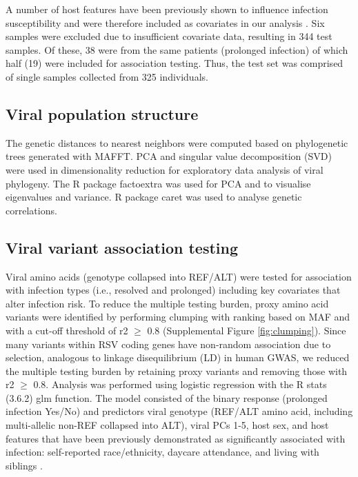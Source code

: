 \documentclass{article} %
\begin{document}
A number of host features have been previously shown to influence infection susceptibility and were therefore included as covariates in our analysis \citep{rosas2022upper}. 
Six samples were excluded due to insufficient covariate data, resulting in 344 test samples. 
Of these, 38 were from the same patients (prolonged infection) of which half (19) were included for association testing. Thus, the test set was comprised of single samples collected from 325 individuals.

\subsection{Viral population structure}
The genetic distances to nearest neighbors were computed based on phylogenetic trees generated with MAFFT. 
PCA and singular value decomposition (SVD) were used in dimensionality reduction for exploratory data analysis of viral phylogeny. 
The R package factoextra was used for PCA and to visualise eigenvalues and variance. R package caret was used to analyse genetic correlations.

\subsection{Viral variant association testing}
Viral amino acids (genotype collapsed into REF/ALT) were tested for association with infection types (i.e., resolved and prolonged) including key covariates that alter infection risk. 
To reduce the multiple testing burden, proxy amino acid variants were identified by performing clumping with ranking based on MAF and with a cut-off threshold of r2 $\ge$ 0.8 (Supplemental Figure \ref{fig:clumping}). 
Since many variants within RSV coding genes have non-random association due to selection, analogous to linkage disequilibrium (LD) in human GWAS, we reduced the multiple testing burden by retaining proxy variants and removing those with r2 $\ge$ 0.8. 
Analysis was performed using logistic regression with the R stats (3.6.2) glm function. 
The model consisted of the binary response (prolonged infection Yes/No) and predictors viral genotype (REF/ALT amino acid, including multi-allelic non-REF collapsed into ALT), viral PCs 1-5, host sex, and host features that have been previously demonstrated as significantly associated with infection: self-reported race/ethnicity, daycare attendance, and living with siblings 
\citep{rosas2022upper}.
\end{document}
